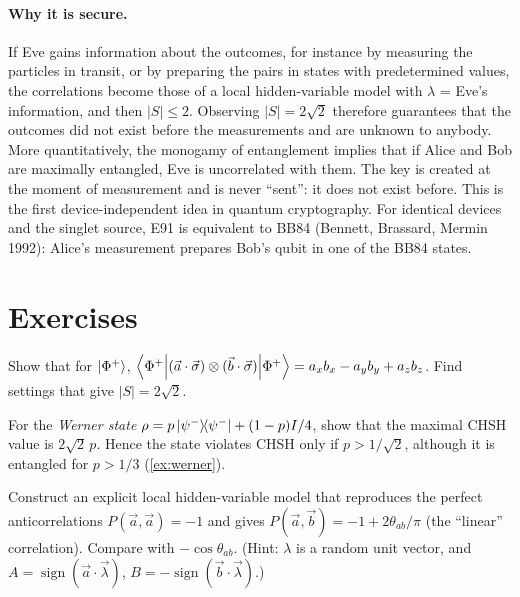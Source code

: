 \paragraph{Why it is secure.} If Eve gains information about the outcomes, for instance by measuring the particles in transit, or by preparing the pairs in states with
predetermined values, the correlations become those of a local hidden-variable model with $\lambda$ = Eve's information, and then $|S|\le2$. Observing $|S|=2\sqrt2$
therefore guarantees that the outcomes did not exist before the measurements and are unknown to anybody. More quantitatively, the monogamy of entanglement implies that
if Alice and Bob are maximally entangled, Eve is uncorrelated with them. The key is created at the moment of measurement and is never ``sent'': it does not exist
before. This is the first device-independent idea in quantum cryptography. For identical devices and the singlet source, E91 is equivalent to BB84 (Bennett, Brassard,
Mermin 1992): Alice's measurement prepares Bob's qubit in one of the BB84 states.

\section{Exercises}
\begin{exercise}
Show that for $\left|\Phi^+\right\rangle$, $\left\langle\Phi^+\middle|(\vec a\cdot\vec\sigma)\otimes(\vec b\cdot\vec\sigma)\middle|\Phi^+\right\rangle=a_xb_x-a_yb_y+a_zb_z$. Find settings that give $|S|=2\sqrt2$.
\end{exercise}
\begin{exercise}
For the \emph{Werner state} $\rho=p\left|\psi^-\middle\rangle\!\middle\langle\psi^-\right|+(1-p)I/4$, show that the maximal CHSH value is $2\sqrt2\,p$. Hence the state violates CHSH only if $p>1/\sqrt2$,
although it is entangled for $p>1/3$ (\cref{ex:werner}).
\end{exercise}
\begin{exercise}
Construct an explicit local hidden-variable model that reproduces the perfect anticorrelations $P(\vec a,\vec a)=-1$ and gives $P(\vec a,\vec b)=-1+2\theta_{ab}/\pi$
(the ``linear'' correlation). Compare with $-\cos\theta_{ab}$. (Hint: $\lambda$ is a random unit vector, and $A=\operatorname{sign}(\vec a\cdot\vec\lambda)$, $B=-\operatorname{sign}(\vec b\cdot\vec\lambda)$.)
\end{exercise}
